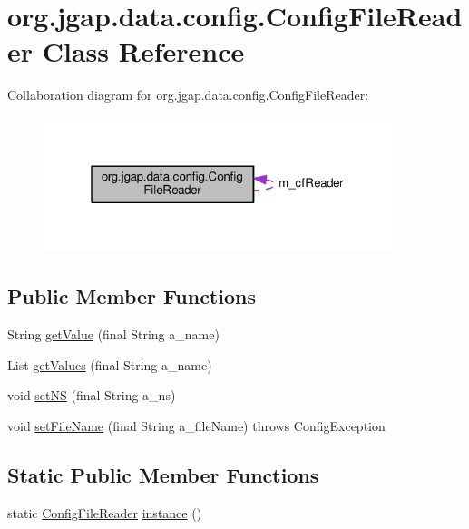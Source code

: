 \hypertarget{classorg_1_1jgap_1_1data_1_1config_1_1_config_file_reader}{\section{org.\-jgap.\-data.\-config.\-Config\-File\-Reader Class Reference}
\label{classorg_1_1jgap_1_1data_1_1config_1_1_config_file_reader}
}


Collaboration diagram for org.\-jgap.\-data.\-config.\-Config\-File\-Reader\-:
\nopagebreak
\begin{figure}[H]
\begin{center}
\leavevmode
\includegraphics[width=289pt]{classorg_1_1jgap_1_1data_1_1config_1_1_config_file_reader__coll__graph}
\end{center}
\end{figure}
\subsection*{Public Member Functions}
\begin{DoxyCompactItemize}
\item 
String \hyperlink{classorg_1_1jgap_1_1data_1_1config_1_1_config_file_reader_ac6690cef894e0925422021e3b8f8d262}{get\-Value} (final String a\-\_\-name)
\item 
List \hyperlink{classorg_1_1jgap_1_1data_1_1config_1_1_config_file_reader_aaf13cc7f4d59501cb22e5dc9c954525b}{get\-Values} (final String a\-\_\-name)
\item 
void \hyperlink{classorg_1_1jgap_1_1data_1_1config_1_1_config_file_reader_aa650a2d37acca205998ea3f8d127da58}{set\-N\-S} (final String a\-\_\-ns)
\item 
void \hyperlink{classorg_1_1jgap_1_1data_1_1config_1_1_config_file_reader_aa1ae5c1b0a3e764ef73c924c6e4d1172}{set\-File\-Name} (final String a\-\_\-file\-Name)  throws Config\-Exception 
\end{DoxyCompactItemize}
\subsection*{Static Public Member Functions}
\begin{DoxyCompactItemize}
\item 
static \hyperlink{classorg_1_1jgap_1_1data_1_1config_1_1_config_file_reader}{Config\-File\-Reader} \hyperlink{classorg_1_1jgap_1_1data_1_1config_1_1_config_file_reader_a598712fa55e9172f6b5a87a1cfd82634}{instance} ()
\end{DoxyCompactItemize}
